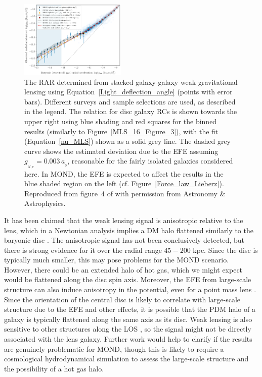 \documentclass[fleqn,usenatbib,useAMS]{mnras} %
\begin{document}
\begin{figure}
	\centering
	\includegraphics[width=0.45\textwidth]{Brouwer_2021_Figure_4}
	\caption{The RAR determined from stacked galaxy-galaxy weak gravitational lensing using Equation~\ref{Light_deflection_angle} (points with error bars). Different surveys and sample selections are used, as described in the legend. The relation for disc galaxy RCs is shown towards the upper right using blue shading and red squares for the binned results (similarly to Figure~\ref{MLS_16_Figure_3}), with the fit (Equation~\ref{nu_MLS}) shown as a solid grey line. The dashed grey curve shows the estimated deviation due to the EFE assuming $g_{_{N,e}} = 0.003 \, a_{_0}$, reasonable for the fairly isolated galaxies considered here. In MOND, the EFE is expected to affect the results in the blue shaded region on the left (cf. Figure~\ref{Force_law_Lieberz}). Reproduced from figure~4 of \citet{Brouwer_2021} with permission from Astronomy \& Astrophysics.}
	\label{Brouwer_2021_Figure_4}
\end{figure}

It has been claimed that the weak lensing signal is anisotropic relative to the lens, which in a Newtonian analysis implies a DM halo flattened similarly to the baryonic disc \citep{Schrabback_2021}. The anisotropic signal has not been conclusively detected, but there is strong evidence for it over the radial range $45-200$ kpc. Since the disc is typically much smaller, this may pose problems for the MOND scenario. However, there could be an extended halo of hot gas, which we might expect would be flattened along the disc spin axis. Moreover, the EFE from large-scale structure can also induce anisotropy in the potential, even for a point mass lens \citep[Equation~\ref{Point_mass_EFE_QUMOND}; see also][]{Oria_2021}. Since the orientation of the central disc is likely to correlate with large-scale structure due to the EFE and other effects, it is possible that the PDM halo of a galaxy is typically flattened along the same axis as its disc. Weak lensing is also sensitive to other structures along the LOS \citep{Feix_2008}, so the signal might not be directly associated with the lens galaxy. Further work would help to clarify if the results are genuinely problematic for MOND, though this is likely to require a cosmological hydrodynamical simulation to assess the large-scale structure and the possibility of a hot gas halo.
\end{document}
